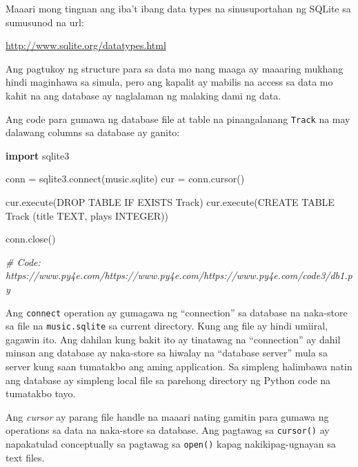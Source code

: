 \documentclass[10pt,]{book}
\newenvironment{Shaded}{}{}
\newcommand{\CommentTok}[1]{\textcolor[rgb]{0.38,0.63,0.69}{\textit{#1}}}
\newcommand{\ExtensionTok}[1]{#1}
\newcommand{\ImportTok}[1]{\textcolor[rgb]{0.00,0.50,0.00}{\textbf{#1}}}
\newcommand{\NormalTok}[1]{#1}
\newcommand{\OperatorTok}[1]{\textcolor[rgb]{0.40,0.40,0.40}{#1}}
\newcommand{\StringTok}[1]{\textcolor[rgb]{0.25,0.44,0.63}{#1}}
\begin{document}
Maaari mong tingnan ang iba't ibang data types na sinusuportahan ng
SQLite sa sumusunod na url:

\url{http://www.sqlite.org/datatypes.html}

Ang pagtukoy ng structure para sa data mo nang maaga ay maaaring mukhang
hindi maginhawa sa simula, pero ang kapalit ay mabilis na access sa data
mo kahit na ang database ay naglalaman ng malaking dami ng data.

Ang code para gumawa ng database file at table na pinangalanang
\texttt{Track} na may dalawang columns sa database ay ganito:

 

\begin{Shaded}
\begin{Highlighting}[]
\ImportTok{import}\NormalTok{ sqlite3}

\NormalTok{conn }\OperatorTok{=}\NormalTok{ sqlite3.}\ExtensionTok{connect}\NormalTok{(}\StringTok{\textquotesingle{}music.sqlite\textquotesingle{}}\NormalTok{)}
\NormalTok{cur }\OperatorTok{=}\NormalTok{ conn.cursor()}

\NormalTok{cur.execute(}\StringTok{\textquotesingle{}DROP TABLE IF EXISTS Track\textquotesingle{}}\NormalTok{)}
\NormalTok{cur.execute(}\StringTok{\textquotesingle{}CREATE TABLE Track (title TEXT, plays INTEGER)\textquotesingle{}}\NormalTok{)}

\NormalTok{conn.close()}

\CommentTok{\# Code: https://www.py4e.com/https://www.py4e.com/https://www.py4e.com/code3/db1.py}
\end{Highlighting}
\end{Shaded}

 
 

Ang \texttt{connect} operation ay gumagawa ng ``connection'' sa database
na naka-store sa file na \texttt{music.sqlite} sa current directory.
Kung ang file ay hindi umiiral, gagawin ito. Ang dahilan kung bakit ito
ay tinatawag na ``connection'' ay dahil minsan ang database ay
naka-store sa hiwalay na ``database server'' mula sa server kung saan
tumatakbo ang aming application. Sa simpleng halimbawa natin ang
database ay simpleng local file sa parehong directory ng Python code na
tumatakbo tayo.

Ang \emph{cursor} ay parang file handle na maaari nating gamitin para
gumawa ng operations sa data na naka-store sa database. Ang pagtawag sa
\texttt{cursor()} ay napakatulad conceptually sa pagtawag sa
\texttt{open()} kapag nakikipag-ugnayan sa text files.
\end{document}
